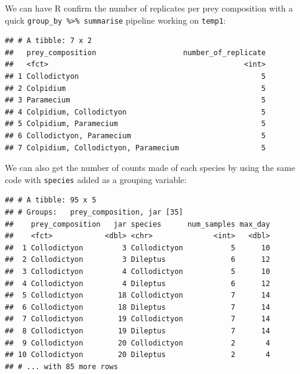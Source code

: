 \documentclass[]{book}
\newenvironment{Shaded}{\begin{snugshade}}{\end{snugshade}}
\newcommand{\DataTypeTok}[1]{\textcolor[rgb]{0.13,0.29,0.53}{#1}}
\newcommand{\KeywordTok}[1]{\textcolor[rgb]{0.13,0.29,0.53}{\textbf{#1}}}
\newcommand{\NormalTok}[1]{#1}
\newcommand{\OperatorTok}[1]{\textcolor[rgb]{0.81,0.36,0.00}{\textbf{#1}}}
\newcommand{\StringTok}[1]{\textcolor[rgb]{0.31,0.60,0.02}{#1}}
\begin{document}
We can have R confirm the number of replicates per prey composition with a quick \texttt{group\_by\ \%\textgreater{}\%\ summarise} pipeline working on \texttt{temp1}:

\begin{Shaded}
\end{Shaded}

\begin{verbatim}
## # A tibble: 7 x 2
##   prey_composition                    number_of_replicate
##   <fct>                                             <int>
## 1 Collodictyon                                          5
## 2 Colpidium                                             5
## 3 Paramecium                                            5
## 4 Colpidium, Collodictyon                               5
## 5 Colpidium, Paramecium                                 5
## 6 Collodictyon, Paramecium                              5
## 7 Colpidium, Collodictyon, Paramecium                   5
\end{verbatim}

We can also get the number of counts made of each species by using the same code with \texttt{species} added as a grouping variable:

\begin{Shaded}
\end{Shaded}

\begin{verbatim}
## # A tibble: 95 x 5
## # Groups:   prey_composition, jar [35]
##    prey_composition   jar species      num_samples max_day
##    <fct>            <dbl> <chr>              <int>   <dbl>
##  1 Collodictyon         3 Collodictyon           5      10
##  2 Collodictyon         3 Dileptus               6      12
##  3 Collodictyon         4 Collodictyon           5      10
##  4 Collodictyon         4 Dileptus               6      12
##  5 Collodictyon        18 Collodictyon           7      14
##  6 Collodictyon        18 Dileptus               7      14
##  7 Collodictyon        19 Collodictyon           7      14
##  8 Collodictyon        19 Dileptus               7      14
##  9 Collodictyon        20 Collodictyon           2       4
## 10 Collodictyon        20 Dileptus               2       4
## # ... with 85 more rows
\end{verbatim}
\end{document}

